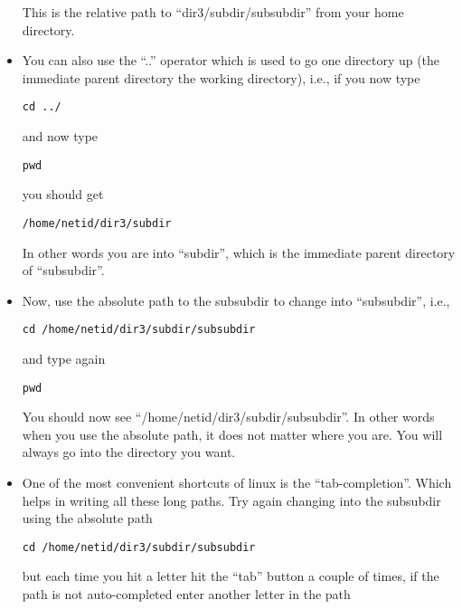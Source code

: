 \documentclass[aps,showpacs,prd,notitlepage,preprintnumbers,amsmath,amssymb,letterpaper]{revtex4}
\begin{document}
\begin{itemize}
This is the relative path to ``dir3/subdir/subsubdir'' from your home
directory.

\item You can also use the ``..'' operator which is used to go one directory up (the immediate parent directory the working directory), i.e., if you now type

\begin{verbatim}
cd ../
\end{verbatim}

and now type

\begin{verbatim}
pwd
\end{verbatim}

you should get

\begin{verbatim}
/home/netid/dir3/subdir
\end{verbatim}

In other words you are into ``subdir'', which is the immediate parent directory
of ``subsubdir''.

\item Now, use the absolute path to the subsubdir to change into ``subsubdir'', i.e.,

\begin{verbatim}
cd /home/netid/dir3/subdir/subsubdir
\end{verbatim}

and type again

\begin{verbatim}
pwd
\end{verbatim}

You should now see ``/home/netid/dir3/subdir/subsubdir''. In other
words when you use the absolute path, it does not matter where you
are. You will always go into the directory you want.

\item One of the most convenient shortcuts of linux is the
  ``tab-completion''. Which helps in writing all these long paths.
  Try again changing into the subsubdir using the absolute path

\begin{verbatim}
cd /home/netid/dir3/subdir/subsubdir
\end{verbatim}

but each time you hit a letter hit the ``tab'' button a couple of
times, if the path is not auto-completed enter another letter in the
path

\end{itemize}
\end{document}
